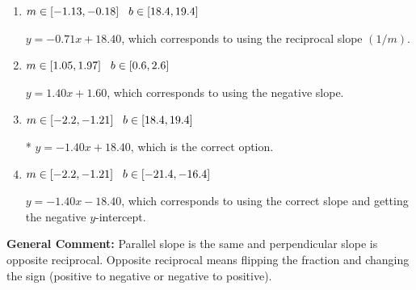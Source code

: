 \documentclass{extbook}[14pt]
\begin{document}
\begin{enumerate}
{\begin{enumerate}[label=\Alph*.]
 $y = -1.40x + 4.00$, which corresponds to correct slope and mis-distributing while simplifying to slope-intercept form.
\item \( m \in [-1.13, -0.18] \hspace*{3mm} b \in [18.4, 19.4] \)

 $y = -0.71x + 18.40$, which corresponds to using the reciprocal slope $(1/m)$.
\item \( m \in [1.05, 1.97] \hspace*{3mm} b \in [0.6, 2.6] \)

 $y = 1.40x + 1.60$, which corresponds to using the negative slope.
\item \( m \in [-2.2, -1.21] \hspace*{3mm} b \in [18.4, 19.4] \)

* $y = -1.40x + 18.40$, which is the correct option.
\item \( m \in [-2.2, -1.21] \hspace*{3mm} b \in [-21.4, -16.4] \)

 $y = -1.40x - 18.40$, which corresponds to using the correct slope and getting the negative $y$-intercept.
\end{enumerate}

\textbf{General Comment:} Parallel slope is the same and perpendicular slope is opposite reciprocal. Opposite reciprocal means flipping the fraction and changing the sign (positive to negative or negative to positive).
}
\end{enumerate}
\end{document}
